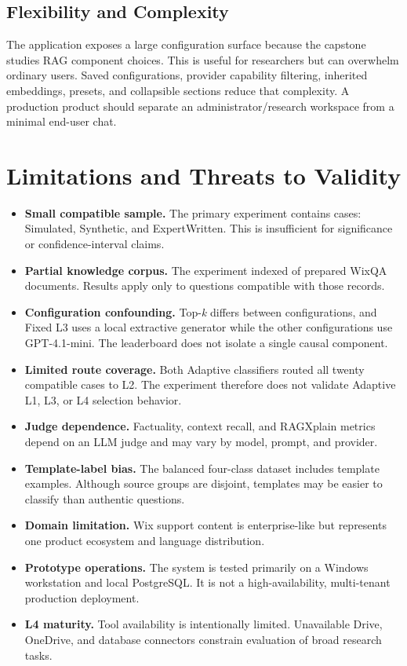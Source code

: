 \subsection{Flexibility and Complexity}

The application exposes a large configuration surface because the capstone
studies RAG component choices. This is useful for researchers but can overwhelm
ordinary users. Saved configurations, provider capability filtering, inherited
embeddings, presets, and collapsible sections reduce that complexity. A
production product should separate an administrator/research workspace from a
minimal end-user chat.

\section{Limitations and Threats to Validity}

\begin{itemize}
  \item \textbf{Small compatible sample.} The primary experiment contains
  \PrimaryExperimentCases{} cases: \PrimarySimulatedCases{} Simulated,
  \PrimarySyntheticCases{} Synthetic, and \PrimaryExpertCases{}
  ExpertWritten. This is insufficient for significance or confidence-interval
  claims.
  \item \textbf{Partial knowledge corpus.} The experiment indexed
  \PrimaryExperimentKBDocuments{} of \PreparedCorpusDocuments{} prepared WixQA
  documents. Results apply only to questions compatible with those records.
  \item \textbf{Configuration confounding.} Top-\textit{k} differs between
  configurations, and Fixed L3 uses a local extractive generator while the
  other configurations use GPT-4.1-mini. The leaderboard does not isolate a
  single causal component.
  \item \textbf{Limited route coverage.} Both Adaptive classifiers routed all
  twenty compatible cases to L2. The experiment therefore does not validate
  Adaptive L1, L3, or L4 selection behavior.
  \item \textbf{Judge dependence.} Factuality, context recall, and RAGXplain
  metrics depend on an LLM judge and may vary by model, prompt, and provider.
  \item \textbf{Template-label bias.} The balanced four-class dataset includes
  \PreparedTemplateRecords{} template examples. Although source groups are
  disjoint, templates may be easier to classify than authentic questions.
  \item \textbf{Domain limitation.} Wix support content is enterprise-like but
  represents one product ecosystem and language distribution.
  \item \textbf{Prototype operations.} The system is tested primarily on a
  Windows workstation and local PostgreSQL. It is not a high-availability,
  multi-tenant production deployment.
  \item \textbf{L4 maturity.} Tool availability is intentionally limited.
  Unavailable Drive, OneDrive, and database connectors constrain evaluation of
  broad research tasks.
\end{itemize}

